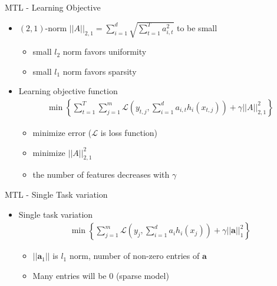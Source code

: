 \documentclass[first=dgreen,second=purple,logo=yellowexc]{aaltoslides}
\begin{document}
\begin{frame}{MTL - Learning Objective}
\begin{itemize}
    \item $(2,1)$-norm  $||A||_{2,1} = \sum_{i=1}^{d}\sqrt{\sum_{t=1}^{T}{a_{i,t}^2}}$ to be small
    \begin{itemize}
        \item small $l_2$ norm favors uniformity
        \item small $l_1$ norm favors sparsity
    \end{itemize}
    \item Learning objective function
    \begin{align*}
        \min\left\{\sum_{t=1}^{T}\sum_{j=1}^{m}\mathcal{L}(y_{t,j},\sum_{i=1}^{d}a_{i,t}h_i(x_{t,j}))+\gamma||A||^2_{2,1}\right\}
    \end{align*}
    \begin{itemize}
        \item minimize error ($\mathcal{L}$ is loss function) 
        \item minimize $||A||^2_{2,1}$
        \item the number of features decreases with $\gamma$
    \end{itemize}
\end{itemize}
\end{frame}


\begin{frame}{MTL - Single Task variation}
\begin{itemize}
    \item Single task variation
    \begin{align*}
        \min\left\{\sum_{j=1}^{m}\mathcal{L}(y_{j},\sum_{i=1}^{d}a_{i}h_i(x_{j}))+\gamma||\mathbf{a}||^2_{1}\right\}
    \end{align*}
    \begin{itemize}
        \item $||\mathbf{a}_1||$ is $l_1$ norm, number of non-zero entries of $\mathbf{a}$
        \item Many entries will be $0$ (sparse model)
    \end{itemize}
\end{itemize}
\end{frame}
\end{document}
